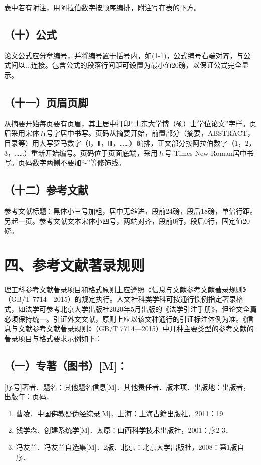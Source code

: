 表中若有附注，用阿拉伯数字按顺序编排，附注写在表的下方。

\subsection{（十）公式}
论文公式应分章编号，并将编号置于括号内，如(1-1)，公式编号右端对齐，与公式间以...连接。包含公式的段落行间距可设置为最小值20磅，以保证公式完全显示。

\subsection{（十一）页眉页脚}
从摘要开始每页要有页眉，其上居中打印“山东大学博（硕）士学位论文”字样。页眉采用宋体五号字居中书写。页码从摘要开始，前置部分（摘要，ABSTRACT，目录等）用大写罗马数字（Ⅰ，Ⅱ，Ⅲ，……）编排，正文部分按阿拉伯数字（1，2，3，……）重新开始编号。页码位于页面底端，采用五号 Times New Roman居中书写。页码数字两侧不要加“-”等修饰线。

\subsection{（十二）参考文献}
参考文献标题：黑体小三号加粗，居中无缩进，段前24磅，段后18磅，单倍行距。另起一页。参考文献文本宋体小四号，两端对齐，段前0行，段后0行，固定值20磅。

\section{四、参考文献著录规则}
理工科参考文献著录项目和格式原则上应遵照《信息与文献参考文献著录规则》（GB/T 7714—2015）的规定执行。人文社科类学科可按通行惯例指定著录格式，如法学可参考北京大学出版社2020年5月出版的《法学引注手册》，但论文全篇必须保持统一。引证外文文献，原则上应以该文种通行的引证标注体例为准。《信息与文献参考文献著录规则》（GB/T 7714—2015）中几种主要类型的参考文献的著录项目与格式要求示例如下：

\subsection{（一）专著（图书）[M]：}
[序号]著者．题名：其他题名信息[M]．其他责任者．版本项．出版地：出版者，出版年：页码．

\begin{enumerate}
\item[1] 曹凌．中国佛教疑伪经综录[M]．上海：上海古籍出版社，2011：19.
\item[2] 钱学森．创建系统学[M]．太原：山西科学技术出版社，2001：序2-3．
\item[3] 冯友兰．冯友兰自选集[M]．2版．北京：北京大学出版社，2008：第1版自序．
\end{enumerate}

